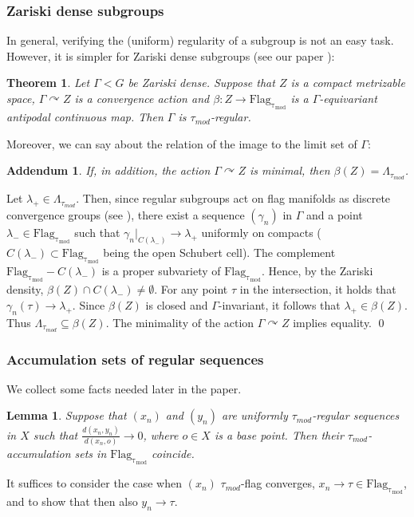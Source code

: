 \documentclass[12pt]{article}
\theoremstyle{boldplain}
\newtheorem{add}[equation]{Addendum}
\newtheorem{lem}[equation]{Lemma}
\newtheorem{thm}[equation]{Theorem}
\theoremstyle{bolddefinition}
\numberwithin{equation}{section}
\def\ga{\gamma}
\def\Ga{\Gamma}
\def\la{\lambda}
\def\La{\Lambda}
\def\acts{\curvearrowright}
\def\Flagt{\operatorname{Flag_{\tau_{mod}}}}
\def\Lat{\La_{\tau_{mod}}}
\def\taumod{\tau_{mod}}
\begin{document}
\subsubsection{Zariski dense subgroups}

In general, verifying the (uniform) regularity of a subgroup is not an easy task. However, it is simpler 
for Zariski dense subgroups (see our paper \cite[Theorem 9.6]{bordif}):

\begin{thm}\label{thm:Zardense}
Let $\Ga<G$ be Zariski dense.
Suppose that $Z$ is a compact metrizable space, $\Ga\acts Z$ is a convergence action 
and $\beta: Z\to \Flagt$ is a $\Ga$-equivariant antipodal continuous map. 
Then $\Ga$ is $\taumod$-regular.  
\end{thm}

Moreover, we can say about the relation of the image to the limit set of $\Ga$:
\begin{add}
\label{add:Zarden}
If, in addition, the action $\Ga\acts Z$ is minimal,
then $\beta(Z)=\Lat$.
\end{add}
\proof 
Let $\la_+\in \Lat$.
Then, 
since regular subgroups act on flag manifolds as discrete convergence groups (see \cite[Lemma 4.19]{anolec}), 
there exist a sequence $(\ga_n)$ in $\Ga$ and a point $\la_-\in \Flagt$ 
such that $\ga_n|_{C(\la_-)}\to\la_+$ uniformly on compacts ($C(\la_-)\subset\Flagt$ being the open Schubert cell).
The complement $\Flagt - C(\la_-)$ is a proper subvariety of $\Flagt$.
Hence, 
by the Zariski density, $\beta(Z)\cap C(\la_-)\neq\emptyset$.
For any point $\tau$ in the intersection,
it holds that $\ga_n(\tau)\to \la_+$. 
Since $\beta(Z)$ is closed and $\Ga$-invariant, it follows that $\la_+\in\beta(Z)$. 
Thus $\Lat\subseteq\beta(Z)$. 
The minimality of the action $\Ga\acts Z$ implies equality.
\qed


\subsubsection{Accumulation sets of regular sequences}

We collect some facts needed later in the paper.

\begin{lem}
\label{lem:smtmlim}
Suppose that $(x_n)$ and $(y_n)$ are uniformly $\taumod$-regular sequences in $X$ 
such that 
$\frac{d(x_n,y_n)}{d(x_n,o)}\to0$,
where $o\in X$ is a base point.
Then their $\taumod$-accumulation sets in $\Flagt$ coincide. 
\end{lem}
\proof
It suffices to consider the case when $(x_n)$ $\taumod$-flag converges, $x_n\to\tau\in\Flagt$,
and to show that then also $y_n\to\tau$.
\end{document}
